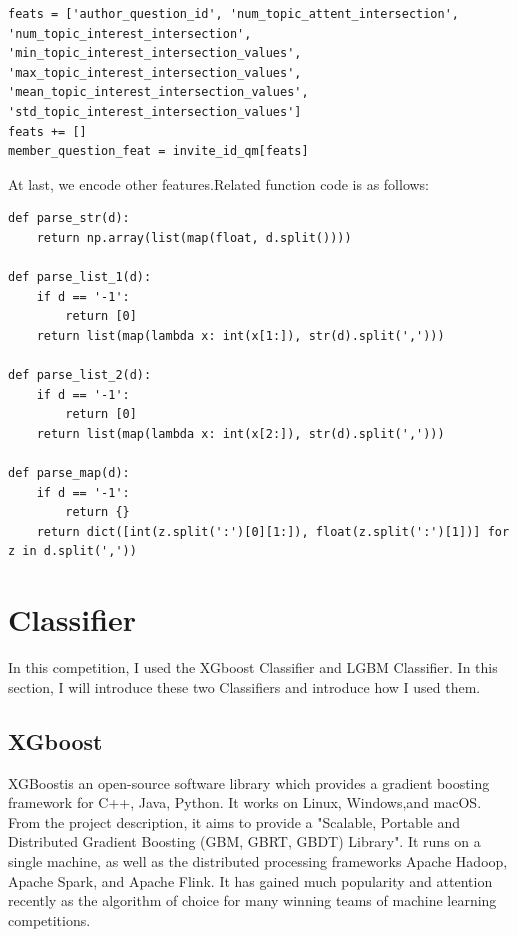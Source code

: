 \documentclass[sigconf]{acmart}
\begin{document}
\begin{lstlisting}
feats = ['author_question_id', 'num_topic_attent_intersection', 'num_topic_interest_intersection', 'min_topic_interest_intersection_values', 'max_topic_interest_intersection_values', 'mean_topic_interest_intersection_values', 'std_topic_interest_intersection_values']
feats += []
member_question_feat = invite_id_qm[feats]
\end{lstlisting}

At last, we encode other features.Related function code is as follows:
\begin{lstlisting}
def parse_str(d):
    return np.array(list(map(float, d.split())))

def parse_list_1(d):
    if d == '-1':
        return [0]
    return list(map(lambda x: int(x[1:]), str(d).split(',')))

def parse_list_2(d):
    if d == '-1':
        return [0]
    return list(map(lambda x: int(x[2:]), str(d).split(',')))

def parse_map(d):
    if d == '-1':
        return {}
    return dict([int(z.split(':')[0][1:]), float(z.split(':')[1])] for z in d.split(','))
\end{lstlisting}




\section{Classifier}

In this competition, I used the XGboost Classifier and LGBM Classifier. In this section, I will introduce these two Classifiers and introduce how I used them.

\subsection{XGboost}


XGBoostis an open-source software library which provides a gradient boosting framework for C++, Java, Python. It works on Linux, Windows,and macOS. From the project description, it aims to provide a "Scalable, Portable and Distributed Gradient Boosting (GBM, GBRT, GBDT) Library". It runs on a single machine, as well as the distributed processing frameworks Apache Hadoop, Apache Spark, and Apache Flink. It has gained much popularity and attention recently as the algorithm of choice for many winning teams of machine learning competitions.
\end{document}
